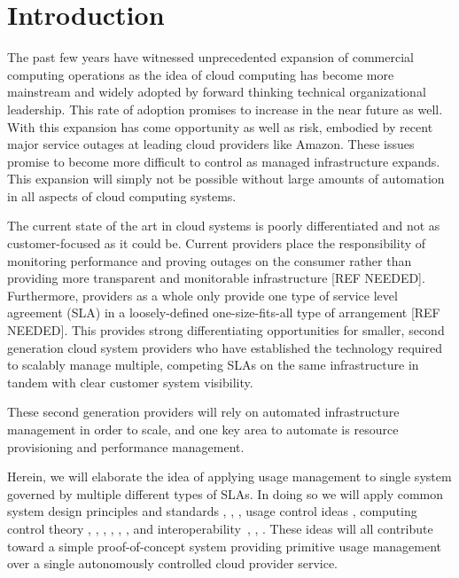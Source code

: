 \section{Introduction}
The past few years have witnessed unprecedented expansion of commercial computing operations as the idea of cloud computing has become more mainstream and widely adopted by forward thinking technical organizational leadership.  This rate of adoption promises to increase in the near future as well.  With this expansion has come opportunity as well as risk, embodied by recent major service outages at leading cloud providers like Amazon.  These issues promise to become more difficult to control as managed infrastructure expands.  This expansion will simply not be possible without large amounts of automation in all aspects of cloud computing systems.

The current state of the art in cloud systems is poorly differentiated and not as customer-focused as it could be.  Current providers place the responsibility of monitoring performance and proving outages on the consumer rather than providing more transparent and monitorable infrastructure [REF NEEDED].  Furthermore, providers as a whole only provide one type of service level agreement (SLA) in a loosely-defined one-size-fits-all type of arrangement [REF NEEDED].  This provides strong differentiating opportunities for smaller, second generation cloud system providers who have established the technology required to scalably manage multiple, competing SLAs on the same infrastructure in tandem with clear customer system visibility.

These second generation providers will rely on automated infrastructure management in order to scale, and one key area to automate is resource provisioning and performance management.

Herein, we will elaborate the idea of applying usage management to single system governed by multiple different types of SLAs.  In doing so we will apply common system design principles and standards \cite{BlCl:01}, \cite{Cl:88}, \cite{ClWrSoBr:02}, usage control ideas \cite{JaHe:08a,JaHeLa:10,PaSa:04}, computing control theory \cite{ctrl:Zhu:2009:CTB:1496909.1496922}, \cite{ctrl:ariba-GL:2009}, \cite{ctrl:wang-cgswrzh:2009}, \cite{ctrl:kjaer-kr:2009}, \cite{ctrl:abdelwahed-bsk:2009}, \cite{ctrl:hellerstein-sw:2009}, and interoperability~\cite{JaHe:04}, \cite{HeJa:05}, \cite{KoLaMaMi:04}.  These ideas will all contribute toward a simple proof-of-concept system providing primitive usage management over a single autonomously controlled cloud provider service.

